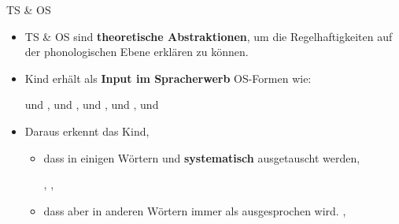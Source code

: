 \begin{frame}{TS \& OS}

\begin{itemize}
	\item TS \& OS sind \textbf{theoretische Abstraktionen},
              um die Regelhaftigkeiten auf der phonologischen Ebene erklären zu können.

\pause 

	\item Kind erhält als \textbf{Input im Spracherwerb} OS-Formen wie: 
	
	\ea \textipa{[\textscr a:t]} und \textipa{[\textscr E:t@]}, \textipa{[\textscr a:t]} und \textipa{[\textscr E:d5]}, \textipa{[bEt]} und \textipa{[bEt@n]}, \textipa{[ba:t]} und \textipa{[bE:d5]}, \textipa{[kInt]} und \textipa{[kInd5]}
	\z 

\pause 

	\item Daraus erkennt das Kind,

	\begin{itemize}
		\item dass in einigen Wörtern \textipa{[d]} und \textipa{[t]} \textbf{systematisch} ausgetauscht werden,
		
		\ea  {}, , 
		\z 
		
		\item dass aber in anderen Wörtern \textipa{[t]} immer als \textipa{[t]} ausgesprochen wird.  
		\ea {}, 
		\z 
	\end{itemize}
		
\end{itemize}

\end{frame}


